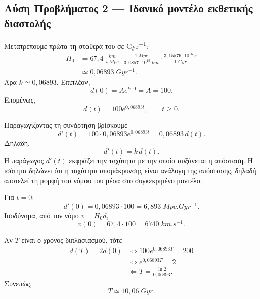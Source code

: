 \subsection*{Λύση Προβλήματος 2 --- Ιδανικό μοντέλο εκθετικής διαστολής}

\begin{alist}
  \item Μετατρέπουμε πρώτα τη σταθερά του  σε
        \si{Gyr^{-1}}:
        \begin{align*}
          H_0
          &=67{,}4\;
            \frac{\si{km}}{\si{s}\,\si{Mpc}}
            \cdot
            \frac{1\;\si{Mpc}}{3{,}0857\cdot10^{19}\;\si{km}}
            \cdot
            \frac{3{,}15576\cdot10^{16}\;\si{s}}{1\;\si{Gyr}}\\
          &\simeq 0{,}06893\;\si{Gyr^{-1}}.
        \end{align*}
        Άρα $k\simeq0{,}06893$. Επιπλέον,
        \[
          d(0)=Ae^{k\cdot0}=A=100.
        \]
        Επομένως,
        \[
          {d(t)=100e^{0{,}06893t}},
          \qquad t\geq0.
        \]

  \item Παραγωγίζοντας τη συνάρτηση βρίσκουμε
        \[
          d'(t)
          =100\cdot0{,}06893e^{0{,}06893t}
          =0{,}06893\,d(t).
        \]
        Δηλαδή,
        \[
          {d'(t)=k\,d(t)}.
        \]
        Η παράγωγος $d'(t)$ εκφράζει την ταχύτητα με την οποία αυξάνεται
        η απόσταση. Η ισότητα δηλώνει ότι η ταχύτητα απομάκρυνσης είναι
        ανάλογη της απόστασης, δηλαδή αποτελεί τη μορφή του νόμου του
         μέσα στο συγκεκριμένο μοντέλο.

        Για $t=0$:
        \[
          d'(0)=0{,}06893\cdot100
          =6{,}893\;\si{Mpc.Gyr^{-1}}.
        \]
        Ισοδύναμα, από τον νόμο $v=H_0d$,
        \[
          v(0)=67{,}4\cdot100
          ={6740\;\si{km.s^{-1}}}.
        \]

  \item Αν $T$ είναι ο χρόνος διπλασιασμού, τότε
        \begin{align*}
          d(T)=2d(0)
          &\Longleftrightarrow
          100e^{0{,}06893T}=200\\
          &\Longleftrightarrow
          e^{0{,}06893T}=2\\
          &\Longleftrightarrow
          T=\frac{\ln2}{0{,}06893}.
        \end{align*}
        Συνεπώς,
        \[
          {T\simeq10{,}06\;\si{Gyr}}.
        \]


\end{alist}

